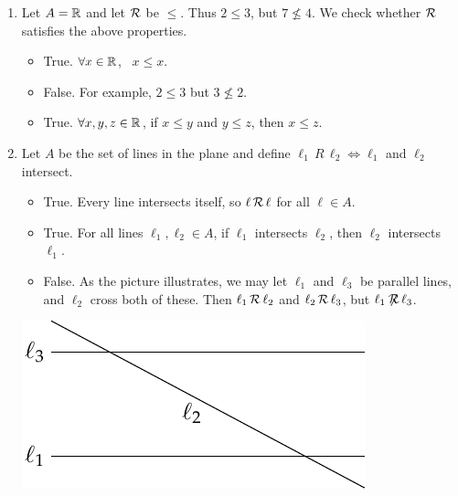 \begin{examples}{}{}
	\begin{enumerate}
	\item Let $A=\mathbb{R}$ and let $\mathcal{R}$ be $\le$. Thus $2\le 3$, but $7\nleq 4$. We check whether $\mathcal{R}$ satisfies the above properties.
	\begin{itemize}
		\item {} True. $\forall x\in\mathbb{R}$, \ $x\le x$.
		\item \symm False. For example, $2\le 3$ but $3\nleq 2$.
		\item \trans True. $\forall x,y,z\in\mathbb{R}$, if $x\le y$ and $y\le z$, then $x\le z$.
	\end{itemize}
	\item Let $A$ be the set of lines in the plane and define $\ell_1\,R\,\ell_2\iff \ell_1$ and $\ell_2$ intersect.\par
	\begin{minipage}[t]{0.65\linewidth}\vspace{0pt}
		\begin{itemize}
			\item {} True. Every line intersects itself, so $\ell\,\mathcal{R}\,\ell$ for all $\ell\in A$.
			\item \symm True. For all lines $\ell_1,\ell_2\in A$, if $\ell_1$ intersects $\ell_2$, then $\ell_2$ intersects $\ell_1$.
			\item \trans False. As the picture illustrates, we may let $\ell_1$ and $\ell_3$ be parallel lines, and $\ell_2$ cross both of these. Then $\ell_1\,\mathcal{R}\,\ell_2$ and $\ell_2\,\mathcal{R}\,\ell_3$, but $\ell_1\not\!\!\mathcal{R}\,\ell_3$.
		\end{itemize}
	\end{minipage}
	\hfill
	\begin{minipage}[t]{0.3\linewidth}\vspace{0pt}
		\includegraphics[width=\textwidth]{relations-07-parallel}
	\end{minipage}
\end{enumerate}
\end{examples}

